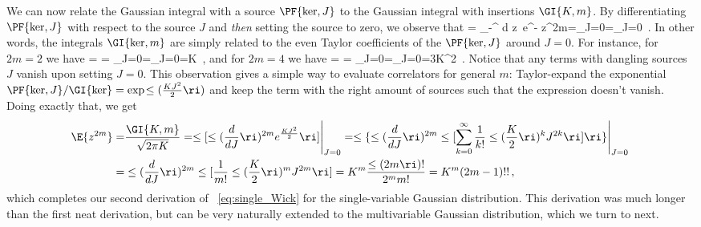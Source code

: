 We can now relate the Gaussian integral with a source $\PF{\ker, J}$ to the Gaussian integral with insertions $\GI{K,m}$. By differentiating $\PF{\ker, J}$ with respect to the source $J$ and \emph{then} setting the source to zero, we observe that
\be
{}= \int_{-\infty}^{\infty} d z\ e^{-} z^{2m}=\Bigg\vert_{J=0}=\Bigg\vert_{J=0}\, .
\ee
In other words, the integrals $\GI{\ker,m}$ are simply related to the even Taylor coefficients of the  $\PF{\ker,J}$ around $J=0$.
For instance, for $2m=2$ we have
\be
{}= = \Bigg\vert_{J=0}=\le[e^{\frac{K J^2}{2}}\le(K+K^2J^2\ri)\ri]\Bigg\vert_{J=0}=K\, ,
\ee
and for $2m=4$ we have
\be
{}= = \Bigg\vert_{J=0}=\le[e^{\frac{K J^2}{2}}\le(3K^2+6K^3J^2+K^4 J^4\ri)\ri]\Bigg\vert_{J=0}=3K^2\, .
\ee
Notice that any terms with dangling sources $J$ vanish upon setting $J=0$. This observation gives a simple way to evaluate correlators for general $m$: Taylor-expand the exponential $\PF{\ker,J}/\GI{\ker} = \exp\!\le(\frac{K J^2}{2}\ri)$ and keep the term with the right amount of sources such that the expression doesn't vanish. Doing exactly that, we get
\begin{align}\label{eq:gaussian-single-variable-insertions}
\E{z^{2m}}=&\frac{\GI{K,m}}{\sqrt{2\pi K}}  =\le[\le(\frac{d}{dJ}\ri)^{2m} e^{\frac{K J^2}{2}}\ri]\Bigg\vert_{J=0}=\le\{\le(\frac{d}{dJ}\ri)^{2m}\le[ \sum_{k=0}^{\infty}\frac{1}{k!} \le(\frac{K}{2}\ri)^{k} J^{2k}\ri]\ri\}\Bigg\vert_{J=0}\, \\
=&\le(\frac{d}{dJ}\ri)^{2m}\le[ \frac{1}{m!} \le(\frac{K}{2}\ri)^m J^{2m}\ri]= K^m\frac{\le(2m\ri) !}{2^m m!}=K^m (2m-1)!!\, ,\nonumber
\end{align}
which completes our second derivation of ~\eqref{eq:single_Wick} for the single-variable Gaussian distribution. This derivation was much longer than the first neat derivation, but can be very naturally extended to the multivariable Gaussian distribution, which we turn to next.



